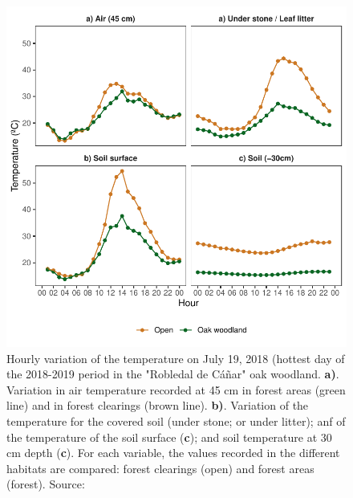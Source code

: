 \begin{figure}
    \centering
    \includegraphics[width=\textwidth]{img/es/es-profiletemp.pdf}\caption{Hourly variation of the temperature on July 19, 2018 (hottest day of the 2018-2019 period in the "Robledal de Cáñar" oak woodland. \textbf{a)}. Variation in air temperature recorded at 45 cm in forest areas (green line) and in forest clearings (brown line). \textbf{b)}. Variation of the temperature for the covered soil (under stone; or under litter); anf of the temperature of the soil surface (\textbf{c}); and soil temperature at 30 cm depth (\textbf{c}). For each variable, the values recorded in the different habitats are compared: forest clearings (open) and forest areas (forest). Source: \autocite{Zamoraetal2021UniendoMacro}}\label{fig:es:temp}
\end{figure}

